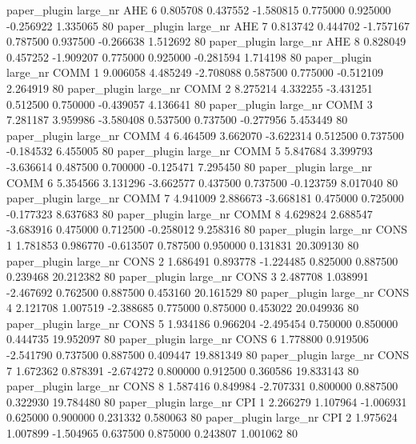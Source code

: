 paper_plugin   large_nr      AHE                 6  0.805708  0.437552  -1.580815 0.775000 0.925000 -0.256922    1.335065 80
paper_plugin   large_nr      AHE                 7  0.813742  0.444702  -1.757167 0.787500 0.937500 -0.266638    1.512692 80
paper_plugin   large_nr      AHE                 8  0.828049  0.457252  -1.909207 0.775000 0.925000 -0.281594    1.714198 80
paper_plugin   large_nr     COMM                 1  9.006058  4.485249  -2.708088 0.587500 0.775000 -0.512109    2.264919 80
paper_plugin   large_nr     COMM                 2  8.275214  4.332255  -3.431251 0.512500 0.750000 -0.439057    4.136641 80
paper_plugin   large_nr     COMM                 3  7.281187  3.959986  -3.580408 0.537500 0.737500 -0.277956    5.453449 80
paper_plugin   large_nr     COMM                 4  6.464509  3.662070  -3.622314 0.512500 0.737500 -0.184532    6.455005 80
paper_plugin   large_nr     COMM                 5  5.847684  3.399793  -3.636614 0.487500 0.700000 -0.125471    7.295450 80
paper_plugin   large_nr     COMM                 6  5.354566  3.131296  -3.662577 0.437500 0.737500 -0.123759    8.017040 80
paper_plugin   large_nr     COMM                 7  4.941009  2.886673  -3.668181 0.475000 0.725000 -0.177323    8.637683 80
paper_plugin   large_nr     COMM                 8  4.629824  2.688547  -3.683916 0.475000 0.712500 -0.258012    9.258316 80
paper_plugin   large_nr     CONS                 1  1.781853  0.986770  -0.613507 0.787500 0.950000  0.131831   20.309130 80
paper_plugin   large_nr     CONS                 2  1.686491  0.893778  -1.224485 0.825000 0.887500  0.239468   20.212382 80
paper_plugin   large_nr     CONS                 3  2.487708  1.038991  -2.467692 0.762500 0.887500  0.453160   20.161529 80
paper_plugin   large_nr     CONS                 4  2.121708  1.007519  -2.388685 0.775000 0.875000  0.453022   20.049936 80
paper_plugin   large_nr     CONS                 5  1.934186  0.966204  -2.495454 0.750000 0.850000  0.444735   19.952097 80
paper_plugin   large_nr     CONS                 6  1.778800  0.919506  -2.541790 0.737500 0.887500  0.409447   19.881349 80
paper_plugin   large_nr     CONS                 7  1.672362  0.878391  -2.674272 0.800000 0.912500  0.360586   19.833143 80
paper_plugin   large_nr     CONS                 8  1.587416  0.849984  -2.707331 0.800000 0.887500  0.322930   19.784480 80
paper_plugin   large_nr      CPI                 1  2.266279  1.107964  -1.006931 0.625000 0.900000  0.231332    0.580063 80
paper_plugin   large_nr      CPI                 2  1.975624  1.007899  -1.504965 0.637500 0.875000  0.243807    1.001062 80
